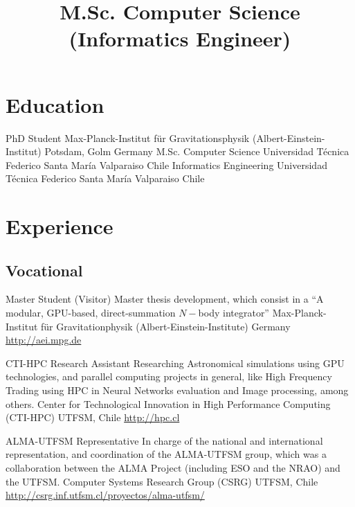 \documentclass[11pt,a4paper]{moderncv}
\title{\large M.Sc. Computer Science (Informatics Engineer)}
\begin{document}
\maketitle

\section{Education}

        {PhD Student}
        {Max-Planck-Institut für Gravitationsphysik}
        {(Albert-Einstein-Institut)}
        {Potsdam, Golm}
        {Germany}
        {M.Sc. Computer Science}
        {Universidad Técnica Federico Santa María}
        {Valparaiso}
        {Chile}
        {}
        {Informatics Engineering}
        {Universidad Técnica Federico Santa María}
        {Valparaiso}
        {Chile}
        {}

\vspace{-0.5cm}

\section{Experience}
\subsection{Vocational}

        {Master Student (Visitor)}
        {Master thesis development, which consist in a %
        ``A modular, GPU-based, direct-summation $N-$body integrator'' }
        {Max-Planck-Institut für Gravitationphysik (Albert-Einstein-Institute)}
        {Germany}
        {\url{http://aei.mpg.de}}

        {CTI-HPC Research Assistant}
        {Researching Astronomical simulations using GPU technologies, %
        and parallel computing projects in general, like High Frequency Trading using
        HPC in Neural Networks evaluation and Image processing, among others.}
        {Center for Technological Innovation in High Performance Computing (CTI-HPC)}
        {UTFSM, Chile}
        {\url{http://hpc.cl}}

        {ALMA-UTFSM Representative}
        {In charge of the national and international representation, and
        coordination of the ALMA-UTFSM group, which was a collaboration between
        the ALMA Project (including ESO and the NRAO) and the UTFSM.}
        {Computer Systems Research Group (CSRG)}
        {UTFSM, Chile}
        {\url{http://csrg.inf.utfsm.cl/proyectos/alma-utfsm/}}
\end{document}

